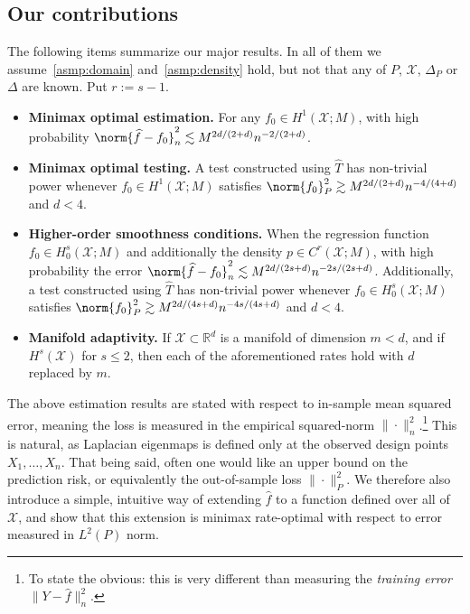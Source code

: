 \documentclass{article}
\newcommand{\Reals}{\mathbb{R}}
\newcommand{\1}{\mathbf{1}}
\newcommand{\Rd}{\Reals^d}
\newcommand{\Xset}{\mathcal{X}}
\newcommand{\mc}[1]{\mathcal{#1}}
\newcommand{\wh}[1]{\widehat{#1}}
\theoremstyle{alden}
\theoremstyle{aldenthm}
\theoremstyle{definition}
\theoremstyle{remark}
\begin{document}
\subsection{Our contributions}
The following items summarize our major results. In all of them we assume~\ref{asmp:domain} and~\ref{asmp:density} hold, but not that any of $P$, $\mc{X}$, $\Delta_P$ or $\Delta$ are known. Put $r := s - 1$.
\begin{itemize}
	\item \textbf{Minimax optimal estimation.} For any $f_0 \in H^1(\Xset;M)$, with high probability $\norm{\wh{f} - f_0}_{n}^2 \lesssim M^{2d/(2 + d)}n^{-2/(2 + d)}$.
	\item \textbf{Minimax optimal testing.}
	A test constructed using $\wh{T}$ has non-trivial power whenever $f_0 \in H^1(\Xset;M)$ satisfies $\norm{f_0}_{P}^2 \gtrsim M^{2d/(2 + d)}n^{-4/(4 + d)}$ and $d < 4$.
	\item \textbf{Higher-order smoothness conditions.} When the regression function $f_0 \in H_0^s(\Xset;M)$ and additionally the density $p \in C^{r}(\mc{X};M)$, with high probability the error $\norm{\wh{f} - f_0}_{n}^2 \lesssim M^{2d/(2s + d)}n^{-2s/(2s + d)}$. Additionally, a test constructed using $\wh{T}$ has non-trivial power whenever $f_0 \in H_0^s(\Xset;M)$ satisfies $\norm{f_0}_{P}^2 \gtrsim M^{2d/(4s + d)}n^{-4s/(4s + d)}$ and $d < 4$.
	\item \textbf{Manifold adaptivity.}
	If $\mc{X} \subset \Rd$ is a manifold of dimension $m < d$, and if $H^s(\mc{X})$ for $s \leq 2$, then each of the aforementioned rates hold with $d$ replaced by $m$.
\end{itemize}
The above estimation results are stated with respect to in-sample mean squared error, meaning the loss is measured in the empirical squared-norm $\|\cdot\|_n^2$.\footnote{To state the obvious: this is very different than measuring the \emph{training error} $\|Y - \wh{f}\|_n^2$.} This is natural, as Laplacian eigenmaps is defined only at the observed design points $X_1,\ldots,X_n$. That being said, often one would like an upper bound on the prediction risk, or equivalently the out-of-sample loss $\|\cdot\|_P^2$. We therefore also introduce a simple, intuitive way of extending $\wh{f}$ to a function defined over all of $\mc{X}$, and show that this extension is minimax rate-optimal with respect to error measured in $L^2(P)$ norm.
\end{document}
